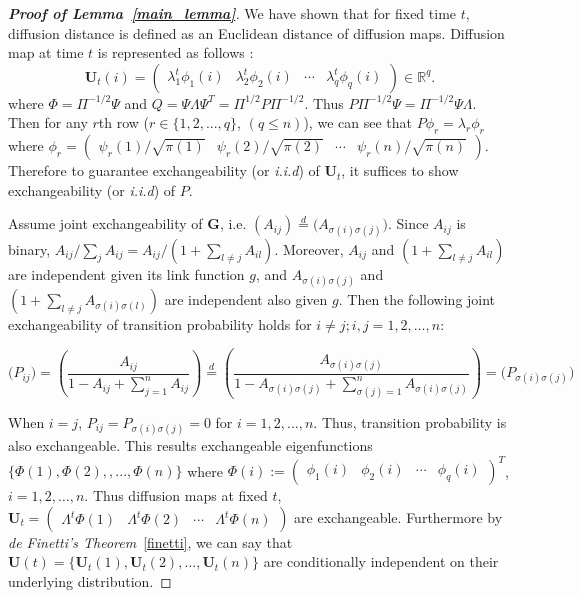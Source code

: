 \documentclass[12pt]{article}
\theoremstyle{definition}
\begin{document}
\begin{proof}[\textbf{Proof of Lemma~\ref{main_lemma}}]
We have shown that for fixed time $t$, diffusion distance is defined as an Euclidean distance of diffusion maps. Diffusion map at time $t$ is represented as follows :
\begin{equation}
	\mathbf{U}_{t}(i) = \begin{pmatrix} \lambda^{t}_{1} \phi_{1}(i) & \lambda^{t}_{2} \phi_{2} (i)  & \cdots & \lambda^{t}_{q} \phi_{q}(i) \end{pmatrix} \in \mathbb{R}^{q}.
\end{equation}
where $\Phi = \Pi^{-1/2}\Psi$ and $Q= \Psi \Lambda \Psi^{T} = \Pi^{1/2} P \Pi^{-1/2}$. 
Thus $P \Pi^{-1/2} \Psi = \Pi^{-1/2} \Psi \Lambda$. 
Then for any $r$th row ($r \in \{1,2, ... , q \}$, $(q \leq n)$), we can see that $P \phi_{r} = \lambda_{r} \phi_{r}$  where $\phi_{r} = \begin{pmatrix}  \psi_{r}(1) / \sqrt{\pi(1)} &  \psi_{r}(2) /  \sqrt{\pi(2)} & \cdots & \psi_{r}(n) /  \sqrt{\pi(n)}  \end{pmatrix}$.
Therefore to guarantee exchangeability (or \textit{i.i.d}) of $\mathbf{U}_{t}$, it suffices to show exchangeability (or \textit{i.i.d}) of $P$.

Assume joint exchangeability of $\mathbf{G}$, i.e. $(A_{ij}) \stackrel{d}{=} \big( A_{\sigma(i) \sigma(j)} \big)$. Since $A_{ij}$ is binary, $A_{ij} / \sum\limits_{j} A_{ij} = A_{ij} /  (1 + \sum\limits_{l \neq j} A_{il})$. Moreover, $A_{ij}$ and $(1 + \sum\limits_{l \neq j} A_{il})$ are independent given its link function $g$, and $A_{\sigma(i) \sigma(j)}$ and $(1 + \sum\limits_{l \neq j} A_{\sigma(i) \sigma(l)})$ are independent also given $g$.
Then the following joint exchangeability of transition probability holds for $i \neq j; i,j = 1,2, \ldots,n$:

\begin{equation}
\big( P_{ij} \big) = \left(  \frac{A_{ij}}{1 - A_{ij} + \sum\limits_{j=1}^{n} A_{ij} } \right)  \stackrel{d}{=} \left( \frac{A_{\sigma(i) \sigma(j)} }{1 - A_{\sigma(i) \sigma(j)} + \sum\limits_{\sigma(j) = 1}^{n} A_{\sigma(i) \sigma(j)} } \right) = \big( P_{\sigma(i) \sigma(j)} \big)
\end{equation}
		
When $i = j$, $P_{ij} = P_{\sigma(i) \sigma(j)} = 0$ for $i=1,2, \ldots, n$. Thus, transition probability is also exchangeable. This results exchangeable eigenfunctions $\{ \Phi(1), \Phi(2), , ... , \Phi(n) \}$ where $\Phi(i) := \begin{pmatrix} \phi_{1}(i) & \phi_{2}(i) & \cdots & \phi_{q}(i) \end{pmatrix}^{T}$, $i=1,2, \ldots, n$. Thus diffusion maps at fixed $t$, $\mathbf{U}_{t} = \begin{pmatrix} \Lambda^{t} \Phi(1)  & \Lambda^{t} \Phi(2) & \cdots & \Lambda^{t} \Phi(n)  \end{pmatrix}$ are exchangeable. Furthermore by \textit{de Finetti's Theorem}~\ref{finetti}, we can say that $\mathbf{U}(t) = \{ \mathbf{U}_{t}(1), \mathbf{U}_{t}(2), \ldots, \mathbf{U}_{t}(n)    \}$ are conditionally independent on their underlying distribution.
\end{proof}
	
\end{document}
